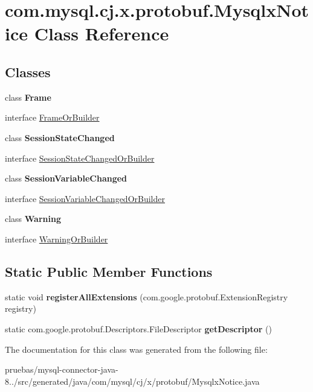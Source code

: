 \hypertarget{classcom_1_1mysql_1_1cj_1_1x_1_1protobuf_1_1_mysqlx_notice}{}\section{com.\+mysql.\+cj.\+x.\+protobuf.\+Mysqlx\+Notice Class Reference}
\label{classcom_1_1mysql_1_1cj_1_1x_1_1protobuf_1_1_mysqlx_notice}
\subsection*{Classes}
\begin{DoxyCompactItemize}
\item 
class {\bfseries Frame}
\item 
interface \mbox{\hyperlink{interfacecom_1_1mysql_1_1cj_1_1x_1_1protobuf_1_1_mysqlx_notice_1_1_frame_or_builder}{Frame\+Or\+Builder}}
\item 
class {\bfseries Session\+State\+Changed}
\item 
interface \mbox{\hyperlink{interfacecom_1_1mysql_1_1cj_1_1x_1_1protobuf_1_1_mysqlx_notice_1_1_session_state_changed_or_builder}{Session\+State\+Changed\+Or\+Builder}}
\item 
class {\bfseries Session\+Variable\+Changed}
\item 
interface \mbox{\hyperlink{interfacecom_1_1mysql_1_1cj_1_1x_1_1protobuf_1_1_mysqlx_notice_1_1_session_variable_changed_or_builder}{Session\+Variable\+Changed\+Or\+Builder}}
\item 
class {\bfseries Warning}
\item 
interface \mbox{\hyperlink{interfacecom_1_1mysql_1_1cj_1_1x_1_1protobuf_1_1_mysqlx_notice_1_1_warning_or_builder}{Warning\+Or\+Builder}}
\end{DoxyCompactItemize}
\subsection*{Static Public Member Functions}
\begin{DoxyCompactItemize}
\item 
\mbox{\label{classcom_1_1mysql_1_1cj_1_1x_1_1protobuf_1_1_mysqlx_notice_ad57d550156408f5afd6f3aaa12d8c0c5}} 
static void {\bfseries register\+All\+Extensions} (com.\+google.\+protobuf.\+Extension\+Registry registry)
\item 
\mbox{\label{classcom_1_1mysql_1_1cj_1_1x_1_1protobuf_1_1_mysqlx_notice_aa99a45f1df9e903f4a4a3c7d9a7ff493}} 
static com.\+google.\+protobuf.\+Descriptors.\+File\+Descriptor {\bfseries get\+Descriptor} ()
\end{DoxyCompactItemize}


The documentation for this class was generated from the following file\+:\begin{DoxyCompactItemize}
\item 
pruebas/mysql-\/connector-\/java-\/8../src/generated/java/com/mysql/cj/x/protobuf/Mysqlx\+Notice.\+java\end{DoxyCompactItemize}
